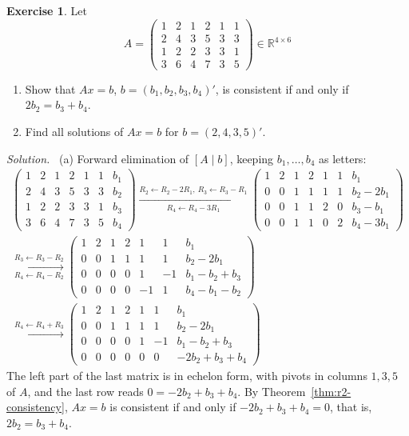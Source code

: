 \documentclass[12pt]{article}
\newcommand{\R}{\mathbb R}
\theoremstyle{definition}
\newtheorem{exercise}{Exercise}
\newenvironment{solution}{\par\noindent\textit{Solution.}\ }{\par\smallskip}
\begin{document}
\begin{exercise}\label{r2-ex-six-unknowns}
Let
\[
A=\begin{pmatrix}1&2&1&2&1&1\\2&4&3&5&3&3\\1&2&2&3&3&1\\3&6&4&7&3&5\end{pmatrix}\in\R^{4\times6}
\]
\begin{enumerate}
\item Show that \(Ax=b\), \(b=(b_1,b_2,b_3,b_4)'\), is consistent if and only if \(2b_2=b_3+b_4\).
\item Find all solutions of \(Ax=b\) for \(b=(2,4,3,5)'\).
\end{enumerate}
\end{exercise}
\begin{solution}
(a) Forward elimination of \([A\mid b]\), keeping \(b_1,\dots,b_4\) as letters:
\[
\begin{gathered}
\left(\begin{array}{cccccc|c}1&2&1&2&1&1&b_1\\2&4&3&5&3&3&b_2\\1&2&2&3&3&1&b_3\\3&6&4&7&3&5&b_4\end{array}\right)
\xrightarrow[R_4\leftarrow R_4-3R_1]{R_2\leftarrow R_2-2R_1,\ R_3\leftarrow R_3-R_1}
\left(\begin{array}{cccccc|c}1&2&1&2&1&1&b_1\\0&0&1&1&1&1&b_2-2b_1\\0&0&1&1&2&0&b_3-b_1\\0&0&1&1&0&2&b_4-3b_1\end{array}\right)
\\
\xrightarrow[R_4\leftarrow R_4-R_2]{R_3\leftarrow R_3-R_2}
\left(\begin{array}{cccccc|c}1&2&1&2&1&1&b_1\\0&0&1&1&1&1&b_2-2b_1\\0&0&0&0&1&-1&b_1-b_2+b_3\\0&0&0&0&-1&1&b_4-b_1-b_2\end{array}\right)
\\
\xrightarrow{R_4\leftarrow R_4+R_3}
\left(\begin{array}{cccccc|c}1&2&1&2&1&1&b_1\\0&0&1&1&1&1&b_2-2b_1\\0&0&0&0&1&-1&b_1-b_2+b_3\\0&0&0&0&0&0&-2b_2+b_3+b_4\end{array}\right)
\end{gathered}
\]
The left part of the last matrix is in echelon form, with pivots in columns \(1,3,5\) of \(A\), and the last row
reads \(0=-2b_2+b_3+b_4\).
By Theorem~\ref{thm:r2-consistency}, \(Ax=b\) is consistent if and only if \(-2b_2+b_3+b_4=0\), that is,
\(2b_2=b_3+b_4\).


\end{solution}
\end{document}
